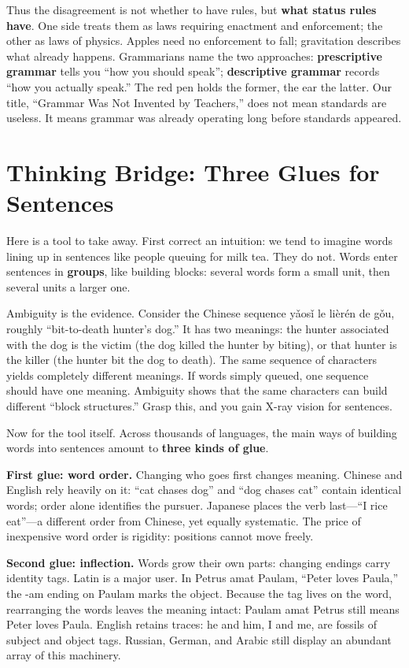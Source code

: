 Thus the disagreement is not whether to have rules, but \textbf{what status rules have}. One side treats them as laws requiring enactment and enforcement; the other as laws of physics. Apples need no enforcement to fall; gravitation describes what already happens. Grammarians name the two approaches: \textbf{prescriptive grammar} tells you ``how you should speak''; \textbf{descriptive grammar} records ``how you actually speak.'' The red pen holds the former, the ear the latter. Our title, ``Grammar Was Not Invented by Teachers,'' does not mean standards are useless. It means grammar was already operating long before standards appeared.

\section{Thinking Bridge: Three Glues for Sentences}
Here is a tool to take away. First correct an intuition: we tend to imagine words lining up in sentences like people queuing for milk tea. They do not. Words enter sentences in \textbf{groups}, like building blocks: several words form a small unit, then several units a larger one.

Ambiguity is the evidence. Consider the Chinese sequence yǎosǐ le lièrén de gǒu, roughly ``bit-to-death hunter's dog.'' It has two meanings: the hunter associated with the dog is the victim (the dog killed the hunter by biting), or that hunter is the killer (the hunter bit the dog to death). The same sequence of characters yields completely different meanings. If words simply queued, one sequence should have one meaning. Ambiguity shows that the same characters can build different ``block structures.'' Grasp this, and you gain X-ray vision for sentences.

Now for the tool itself. Across thousands of languages, the main ways of building words into sentences amount to \textbf{three kinds of glue}.

\textbf{First glue: word order.} Changing who goes first changes meaning. Chinese and English rely heavily on it: ``cat chases dog'' and ``dog chases cat'' contain identical words; order alone identifies the pursuer. Japanese places the verb last---``I rice eat''---a different order from Chinese, yet equally systematic. The price of inexpensive word order is rigidity: positions cannot move freely.

\textbf{Second glue: inflection.} Words grow their own parts: changing endings carry identity tags. Latin is a major user. In Petrus amat Paulam, ``Peter loves Paula,'' the -am ending on Paulam marks the object. Because the tag lives on the word, rearranging the words leaves the meaning intact: Paulam amat Petrus still means Peter loves Paula. English retains traces: he and him, I and me, are fossils of subject and object tags. Russian, German, and Arabic still display an abundant array of this machinery.

